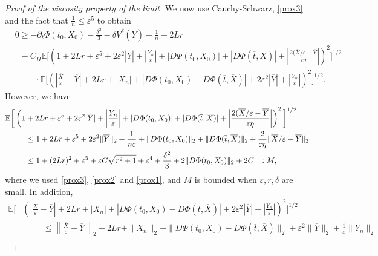 \documentclass[reqno,11pt]{amsart}
\numberwithin{equation}{section}
\newcommand{\yh}[1]{{\color{orange}[YH: #1]}}
\newcommand{\e}{\varepsilon}
\newcommand{\nd}{\noindent}
\begin{document}
\begin{proof}[Proof of the viscosity property of the limit]
    \nd
    We now use Cauchy-Schwarz, \eqref{prox3} and the fact that $\frac{1}{n}\le \e^5$ to obtain
    \begin{align}
    &0\ge -\partial_t\Phi(t_0,X_0)-\frac{\delta^2}{3}-\delta V^\delta(\overline{Y})-\frac{1}{n}-2Lr\nonumber\\
    &\;\; -C_H\mathbb{E}\bigg[ \left(1+2Lr+\e^5 + 2\e^2|\overline{Y}| +\left|\frac{Y_n}{\e}\right|+|D\Phi(t_0,X_0)|+|D\Phi(\overline{t},\overline{X})|+\left|\frac{2(\overline{X}/\e-\overline{Y}}{\e\eta}   \right|\right)^2\bigg]^{1/2}\nonumber  \\
    & \hspace{1cm} \cdot\mathbb{E}\bigg[\left( \left|\frac{\overline{X}}{\e}-\overline{Y}\right|+ 2Lr+|X_n|+|D\Phi(t_0,X_0)-D\Phi(\overline{t},\overline{X})|+2\e^2|\overline{Y}|+\left|\frac{Y_n}{\e}\right|\right)^2\bigg]^{1/2}.\label{ineq3}
    \end{align}
    However, we have
    \begin{align*}
        \mathbb{E}\bigg[ &\left(1+2Lr+\e^5 + 2\e^2|\overline{Y}| +\left|\frac{Y_n}{\e}\right|+|D\Phi(t_0,X_0)|+|D\Phi(\overline{t},\overline{X})|+\left|\frac{2(\overline{X}/\e-\overline{Y}}{\e\eta}   \right|\right)^2\bigg]^{1/2}\\
        &\hspace{0.5cm}\le  1+2Lr+\e^{5}+2\e^2\|\overline{Y}\|_2+\frac{1}{n\e} +\|D\Phi(t_0,X_0)\|_2 +\|D\Phi(\overline{t},\overline{X})\|_2 +\frac{2}{\e\eta}\|\overline{X}/\e-\overline{Y}\|_2   \\
        &\hspace{0.5cm}\le  1+(2Lr)^2+\e^{5}+ \e C\sqrt{r^2+1}+\e^4+\frac{\delta^2}{3}+2 \|D\Phi(t_0,X_0)\|_2+2C =:M,
    \end{align*}
    where we used \eqref{prox3}, \eqref{prox2} and \eqref{prox1}, and $M$ is bounded when $\e,r,\delta$ are small. In addition,
    \begin{align*}
    \mathbb{E}\bigg[&\left(\left|\frac{\overline{X}}{\e}-\overline{Y}\right|+ 2Lr+|X_n|+|D\Phi(t_0,X_0)-D\Phi(\overline{t},\overline{X})|+2\e^2|\overline{Y}|+\left|\frac{Y_n}{\e}\right|\right)^2\bigg]^{1/2}\\
    &\hspace{1cm}\le \left\|\frac{\overline{X}}{\e}-\overline{Y}\right\|_2+ 2Lr+\|X_n\|_2+\|D\Phi(t_0,X_0)-D\Phi(\overline{t},\overline{X})\|_2+\e^2\|\overline{Y}\|_2+\frac{1}{\e}\|Y_n\|_2\\

\end{align*}
\end{proof}
\end{document}

